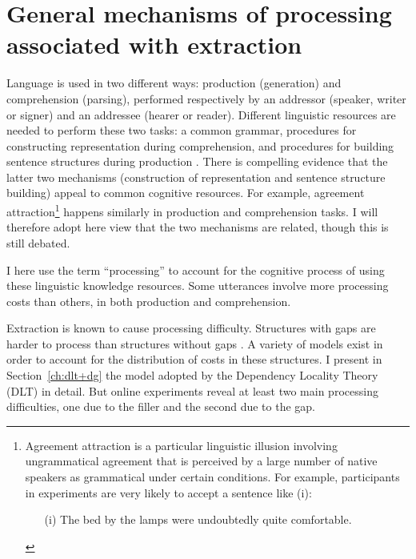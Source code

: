 
\section{General mechanisms of processing associated with extraction}
\label{ch:processing}

Language is used in two different ways: production (generation) and comprehension (parsing), performed respectively by an addressor (speaker, writer or signer) and an addressee (hearer or reader).
Different linguistic resources are needed to perform these two tasks: a common grammar, procedures for constructing representation during comprehension, and procedures for building sentence structures during production \citep[236-237]{Momma.2018}. 
There is compelling evidence that the latter two mechanisms (construction of representation and sentence structure building) appeal to common cognitive resources. For example, agreement attraction\footnote{Agreement attraction is a particular linguistic illusion involving ungrammatical agreement that is perceived by a large number of native speakers as grammatical under certain conditions. For example, participants in experiments are very likely to accept a sentence like (i):
\begin{itemize}
    \item[(i)] The bed by the lamps were undoubtedly quite comfortable. \citep{Schlueter.2019}
\end{itemize}}
happens similarly in production and comprehension tasks.
I will therefore adopt here  view that the two mechanisms are related, though this is still debated.

I here use the term ``processing'' to account for the cognitive process of using these linguistic knowledge resources. Some utterances involve more processing costs than others, in both production and comprehension.

Extraction is known to cause processing difficulty. Structures with gaps are harder to process than structures without gaps \citep{Wanner.1978,Kluender.1993.Subjacency}. A variety of models exist in order to account for the distribution of costs in these structures. I present in Section~\ref{ch:dlt+dg} the model adopted by the Dependency Locality Theory (DLT) in detail. But online experiments reveal at least two main processing difficulties, one due to the filler and the second due to the gap.

